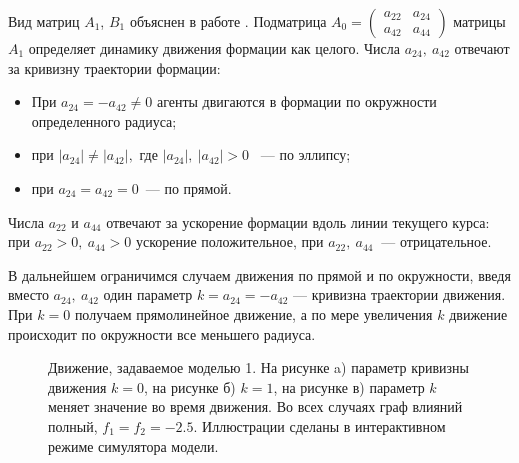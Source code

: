 Вид матриц $A_1$, $B_1$ объяснен в работе \cite{veerman2005flocks}. Подматрица 
$A_0=\left( \begin{array}{cc}
a_{22} & a_{24} \\
a_{42} & a_{44} \end{array} \right)$ 
матрицы $A_1$ определяет динамику движения формации как целого. Числа $a_{24},\ a_{42}$ отвечают за кривизну траектории формации:

\begin{itemize}
\item При $a_{24}=-a_{42}\neq 0$ агенты двигаются в формации по окружности определенного радиуса; 
\item при $|a_{24}|\neq|a_{42}|,$ где $|a_{24}|,\ |a_{42}|>0$ ~--- по эллипсу;
\item при $a_{24}=a_{42}=0$~--- по прямой. 
\end{itemize}

Числа $a_{22}$ и $a_{44}$ отвечают за ускорение формации вдоль линии текущего курса:  при $a_{22}>0,\ a_{44}>0$ ускорение положительное, при $a_{22},\ a_{44}~$ --- отрицательное. 

В дальнейшем ограничимся случаем движения по прямой и по окружности, введя вместо $a_{24},\ a_{42}$ один параметр $k=a_{24}=-a_{42}$ --- кривизна траектории движения. При $k=0$ получаем прямолинейное движение, а по мере увеличения $k$ движение происходит по окружности все меньшего радиуса.

\begin{figure}[h]
  \begin{minipage}[h]{0.32\linewidth}
  \end{minipage}
  \hfill
  \begin{minipage}[h]{0.32\linewidth}
  \end{minipage}
   \hfill
  \begin{minipage}[h]{0.32\linewidth}
  \end{minipage}
  \caption{Движение, задаваемое моделью 1. На рисунке a) параметр кривизны движения $k=0$, на рисунке б) $k=1$, на рисунке в) параметр $k$ меняет значение во время движения. Во всех случаях граф влияний полный, $f_1=f_2=-2.5$. Иллюстрации сделаны в интерактивном режиме симулятора модели.}
\label{fig:linear-motion}
\end{figure}

